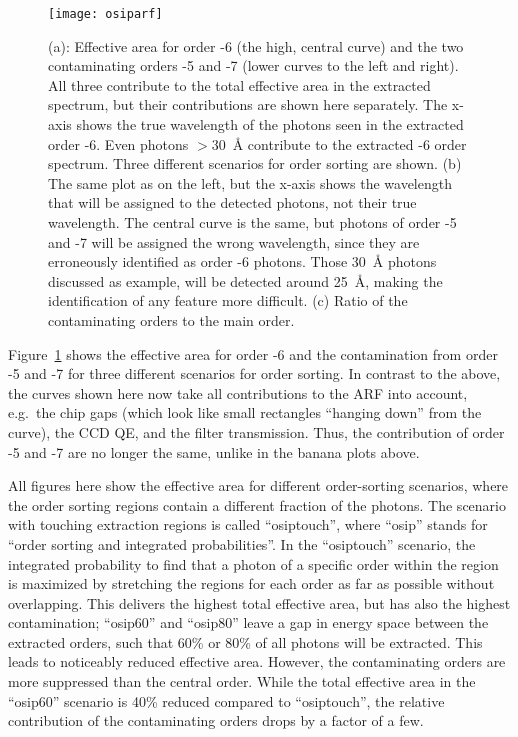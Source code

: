 \documentclass[12pt]{spieman}  %
\begin{document}
\begin{spacing}{2}
\begin{figure}
    \centering
    \texttt{[image: osiparf]}
    \caption {\label{fig:osiparf}
    (a): Effective area for order -6 (the high, central curve) and the two contaminating orders -5 and -7 (lower curves to the left and right). All three contribute to the total effective area in the extracted spectrum, but their contributions are shown here separately. The x-axis shows the true wavelength of the photons seen in the extracted order -6. Even photons $>30$~\AA{} contribute to the extracted -6 order spectrum. Three different scenarios for order sorting are shown.
    (b) The same plot as on the left, but the x-axis shows the wavelength that will be assigned to the detected photons, not their true wavelength. The central curve is the same, but photons of order -5 and -7 will be assigned the wrong wavelength, since they are erroneously identified as order -6 photons. Those 30~\AA{} photons discussed as example, will be detected around 25~\AA{}, making the identification of any feature more difficult.
    (c) Ratio of the contaminating orders to the main order.
}
\end{figure}

Figure~\ref{fig:osiparf} shows the effective area for order -6 and the contamination from order -5 and -7 for three different scenarios for order sorting. In contrast to the above, the curves shown here now take all contributions to the ARF into account, e.g.\ the chip gaps (which look like small rectangles ``hanging down'' from the curve), the CCD QE, and the filter transmission. Thus, the contribution of order -5 and -7 are no longer the same, unlike in the banana plots above.

All figures here show the effective area for different order-sorting scenarios, where the order sorting regions contain a different fraction of the photons. The scenario with touching extraction regions is called ``osiptouch'', where ``osip'' stands for ``order sorting and integrated probabilities''. In the ``osiptouch'' scenario, the integrated probability to find that a photon of a specific order within the region is maximized by stretching the regions for each order as far as possible without overlapping. This delivers the highest total effective area, but has also the highest contamination; ``osip60'' and ``osip80'' leave a gap in energy space between the extracted orders, such that 60\% or 80\% of all photons will be extracted. This leads to noticeably reduced effective area. However, the contaminating orders are more suppressed than the central order. While the total effective area in the ``osip60'' scenario is 40\% reduced compared to ``osiptouch'', the relative contribution of the contaminating orders drops by a factor of a few.


\end{spacing}
\end{document}
